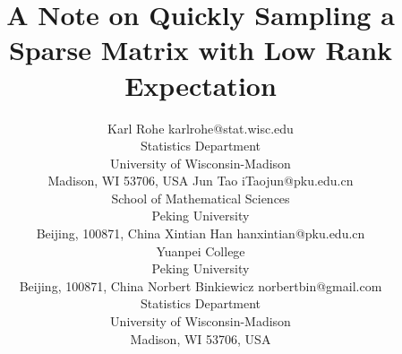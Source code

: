 \documentclass[twoside,11pt]{article}
\begin{document}
\title{A Note on Quickly Sampling a Sparse Matrix with Low Rank Expectation}

\author{\name Karl Rohe \email   karlrohe@stat.wisc.edu\\
       \addr Statistics Department \\
       University of Wisconsin-Madison\\
       Madison, WI 53706, USA
       \AND
       \name Jun Tao \email iTaojun@pku.edu.cn \\
       \addr School of Mathematical Sciences\\
            Peking University\\
       Beijing, 100871, China
        \AND
       \name Xintian Han \email hanxintian@pku.edu.cn \\
       \addr Yuanpei College\\
       Peking University\\
       Beijing, 100871, China
       \AND
       \name Norbert Binkiewicz \email norbertbin@gmail.com\\
        \addr Statistics Department \\
       University of Wisconsin-Madison\\
       Madison, WI 53706, USA
       }
       


\maketitle
\end{document}

